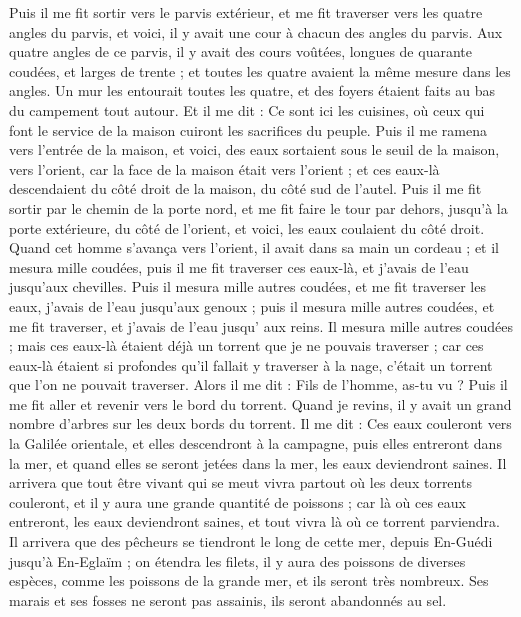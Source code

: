 \begin{multicols}{2}
Puis il me fit sortir vers le parvis extérieur, et me fit traverser vers les quatre angles du parvis, et voici, il y avait une cour à chacun des angles du parvis.
Aux quatre angles de ce parvis, il y avait des cours voûtées, longues de quarante coudées, et larges de trente ; et toutes les quatre avaient la même mesure dans les angles.
Un mur les entourait toutes les quatre, et des foyers étaient faits au bas du campement tout autour.
Et il me dit : Ce sont ici les cuisines, où ceux qui font le service de la maison cuiront les sacrifices du peuple.
\VerseOne{}Puis il me ramena vers l'entrée de la maison, et voici, des eaux sortaient sous le seuil de la maison, vers l'orient, car la face de la maison était vers l'orient ; et ces eaux-là descendaient du côté droit de la maison, du côté sud de l'autel\FTNT{}.
Puis il me fit sortir par le chemin de la porte nord, et me fit faire le tour par dehors, jusqu'à la porte extérieure, du côté de l’orient, et voici, les eaux coulaient du côté droit.
Quand cet homme s’avança vers l'orient, il avait dans sa main un cordeau ; et il mesura mille coudées, puis il me fit traverser ces eaux-là, et j’avais de l’eau jusqu'aux chevilles.
Puis il mesura mille autres coudées, et me fit traverser les eaux, j’avais de l’eau jusqu'aux genoux ; puis il mesura mille autres coudées, et me fit traverser, et j’avais de l’eau  jusqu’ aux reins.
Il mesura mille autres coudées ; mais ces eaux-là étaient déjà un torrent que je ne pouvais traverser ; car ces eaux-là étaient si profondes qu'il fallait y traverser à la nage, c’était un torrent que l'on ne pouvait traverser.
Alors il me dit : Fils de l’homme, as-tu vu ? Puis il me fit aller et revenir vers le bord du torrent.
Quand je revins, il y avait un grand nombre d'arbres sur les deux bords du torrent.
Il me dit : Ces eaux couleront vers la Galilée orientale, et elles descendront à la campagne, puis elles entreront dans la mer, et quand elles se seront jetées dans la mer, les eaux deviendront saines.
Il arrivera que tout être vivant qui se meut vivra partout où les deux torrents couleront, et il y aura une grande quantité de poissons ; car là où ces eaux entreront, les eaux deviendront saines, et tout vivra là où ce torrent parviendra.
Il arrivera que des pêcheurs se tiendront le long de cette mer, depuis En-Guédi jusqu’à En-Eglaïm ; on étendra les filets, il y aura des poissons de diverses espèces, comme les poissons de la grande mer, et ils seront très nombreux.
Ses marais et ses fosses ne seront pas assainis, ils seront abandonnés au sel.

\end{multicols}
